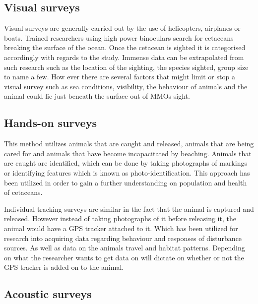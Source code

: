 \subsection{Visual surveys}%

Visual surveys are generally carried out by the use of helicopters, airplanes or boats.
Trained researchers using high power binoculars search for cetaceans breaking the surface of the ocean. 
Once the cetacean is sighted it is categorised accordingly with regards to the study.
Immense data can be extrapolated from such research such as the location of the sighting, the species sighted, group size to name a few\cite{campbell_inter-annual_2015}.
How ever there are several factors that might limit or stop a visual survey such as sea conditions, visibility, the behaviour of animals and the animal could lie just beneath the surface out of MMOs sight.

\subsection{Hands-on surveys}

This method utilizes animals that are caught and released, animals that are being cared for and animals that have become incapacitated by beaching. 
Animals that are caught are identified, which can be done by taking photographs of markings or identifying features 
which is known as photo-identification\cite{booth_methods_2020}.
This approach has been utilized in order to gain a further understanding on population and health of cetaceans.

Individual tracking surveys are similar in the fact that the animal is captured and released.
However instead of taking photographs of it before releasing it, the animal would have a GPS tracker attached to it. 
Which has been utilized for research into acquiring data regarding behaviour and responses of disturbance sources. 
As well as data on the animals travel and habitat patterns. 
Depending on what the researcher wants to get data on will dictate on whether or not the GPS tracker is added on to the animal\cite{booth_methods_2020}.

\subsection{Acoustic surveys}

